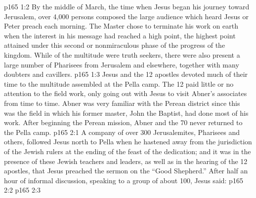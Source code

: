\vs p165 1:2 By the middle of March, the time when Jesus began his journey toward Jerusalem, over 4,000 persons composed the large audience which heard Jesus or Peter preach each morning. The Master chose to terminate his work on earth when the interest in his message had reached a high point, the highest point attained under this second or nonmiraculous phase of the progress of the kingdom. While  of the multitude were truth seekers, there were also present a large number of Pharisees from Jerusalem and elsewhere, together with many doubters and cavillers.
\vs p165 1:3 Jesus and the 12 apostles devoted much of their time to the multitude assembled at the Pella camp. The 12 paid little or no attention to the field work, only going out with Jesus to visit Abner’s associates from time to time. Abner was very familiar with the Perean district since this was the field in which his former master, John the Baptist, had done most of his work. After beginning the Perean mission, Abner and the 70 never returned to the Pella camp.
\vs p165 2:1 A company of over 300 Jerusalemites, Pharisees and others, followed Jesus north to Pella when he hastened away from the jurisdiction of the Jewish rulers at the ending of the feast of the dedication; and it was in the presence of these Jewish teachers and leaders, as well as in the hearing of the 12 apostles, that Jesus preached the sermon on the “Good Shepherd.” After half an hour of informal discussion, speaking to a group of about 100, Jesus said:
\vs p165 2:2 \pc {}
\vs p165 2:3 
